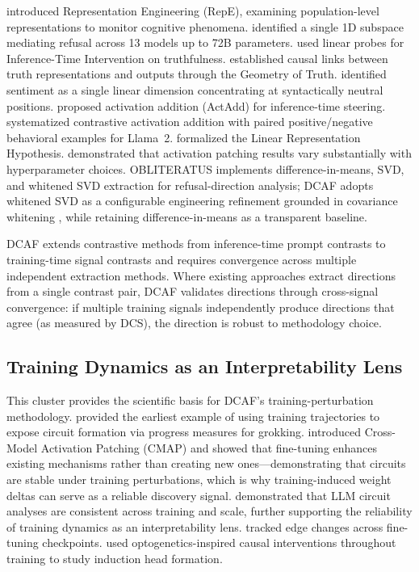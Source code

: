 \documentclass[11pt]{article}
\begin{document}
\citet{zou2023repe} introduced Representation Engineering (RepE), examining population-level representations to monitor cognitive phenomena. \citet{arditi2024refusal} identified a single 1D subspace mediating refusal across 13 models up to 72B parameters. \citet{li2023iti} used linear probes for Inference-Time Intervention on truthfulness. \citet{marks2024geometry} established causal links between truth representations and outputs through the Geometry of Truth. \citet{tigges2023sentiment} identified sentiment as a single linear dimension concentrating at syntactically neutral positions. \citet{turner2023actadd} proposed activation addition (ActAdd) for inference-time steering. \citet{panickssery2024caa} systematized contrastive activation addition with paired positive/negative behavioral examples for Llama~2. \citet{park2024linear} formalized the Linear Representation Hypothesis. \citet{zhang2024bestpractices} demonstrated that activation patching results vary substantially with hyperparameter choices. OBLITERATUS \citep{obliteratus2026paper,obliteratus2026repo} implements difference-in-means, SVD, and whitened SVD extraction for refusal-direction analysis; DCAF adopts whitened SVD as a configurable engineering refinement grounded in covariance whitening \citep{kessy2018optimal}, while retaining difference-in-means as a transparent baseline.

DCAF extends contrastive methods from inference-time prompt contrasts to training-time signal contrasts and requires convergence across multiple independent extraction methods. Where existing approaches extract directions from a single contrast pair, DCAF validates directions through cross-signal convergence: if multiple training signals independently produce directions that agree (as measured by DCS), the direction is robust to methodology choice.

\subsection{Training Dynamics as an Interpretability Lens}
\label{sec:training-dynamics-interpretability-lens}

This cluster provides the scientific basis for DCAF's training-perturbation methodology. \citet{nanda2023grokking} provided the earliest example of using training trajectories to expose circuit formation via progress measures for grokking. \citet{prakash2024finetuning} introduced Cross-Model Activation Patching (CMAP) and showed that fine-tuning enhances existing mechanisms rather than creating new ones---demonstrating that circuits are stable under training perturbations, which is why training-induced weight deltas can serve as a reliable discovery signal. \citet{tigges2024consistent} demonstrated that LLM circuit analyses are consistent across training and scale, further supporting the reliability of training dynamics as an interpretability lens. \citet{wang2025finetuning} tracked edge changes across fine-tuning checkpoints. \citet{singh2024induction} used optogenetics-inspired causal interventions throughout training to study induction head formation.
\end{document}
